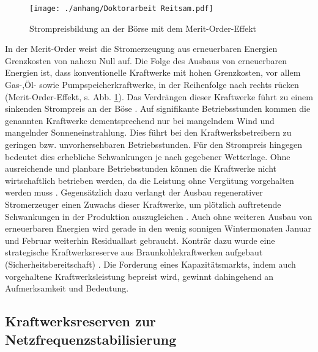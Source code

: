 		\begin{figure} [H]
			\centering
			\label{Abb. Strompreisbildung Merit Order}
			\texttt{[image: ./anhang/Doktorarbeit Reitsam.pdf]}
			\caption{Strompreisbildung an der Börse mit dem Merit-Order-Effekt \cite[S. 68]{Doktorarbeit_Reitsam}}
		\end{figure}
		
		In der Merit-Order weist die Stromerzeugung aus erneuerbaren Energien Grenzkosten von nahezu Null auf.
		Die Folge des Ausbaus von erneuerbaren Energien ist, dass konventionelle Kraftwerke mit hohen Grenzkosten, vor allem Gas-,Öl- sowie Pumpspeicherkraftwerke, in der Reihenfolge nach rechts rücken (Merit-Order-Effekt, s. Abb. \ref{Abb. Strompreisbildung Merit Order}).
		Das Verdrängen dieser Kraftwerke führt zu einem sinkenden Strompreis an der Böse \cite[S. 11 f.]{Frauenhofer_PV_Bericht}.
		Auf signifikante Betriebsstunden kommen die genannten Kraftwerke dementsprechend nur bei mangelndem Wind und mangelnder Sonneneinstrahlung.
		Dies führt bei den Kraftwerksbetreibern zu geringen bzw. unvorhersehbaren Betriebsstunden. 
 		Für den Strompreis hingegen bedeutet dies erhebliche Schwankungen je nach gegebener Wetterlage.
		Ohne ausreichende und planbare Betriebsstunden können die Kraftwerke nicht wirtschaftlich betrieben werden, da die Leistung ohne Vergütung vorgehalten werden muss \cite[S. 11 f.]{Frauenhofer_PV_Bericht}.
		Gegensätzlich dazu verlangt der Ausbau regenerativer Stromerzeuger einen Zuwachs dieser Kraftwerke, um plötzlich auftretende Schwankungen in der Produktion auszugleichen \cite[S. 66 ff.]{Doktorarbeit_Reitsam}.
		Auch ohne weiteren Ausbau von erneuerbaren Energien wird gerade in den wenig sonnigen Wintermonaten Januar und Februar weiterhin Residuallast gebraucht.
		Konträr dazu wurde eine strategische Kraftwerksreserve aus Braunkohlekraftwerken aufgebaut (Sicherheitsbereitschaft) \cite{bbh_blog}.		
		Die Forderung eines Kapazitätsmarkts, indem auch vorgehaltene Kraftwerksleistung bepreist wird, gewinnt dahingehend an Aufmerksamkeit und Bedeutung.
		
	\subsection{Kraftwerksreserven zur Netzfrequenzstabilisierung}
	
